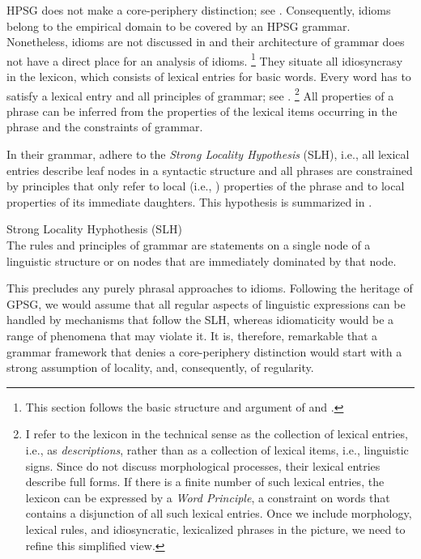 \documentclass[output=paper,biblatex,babelshorthands,newtxmath,draftmode,colorlinks,citecolor=brown]{langscibook}
\begin{document}
\largerpage
HPSG does not make a core-periphery distinction; see \citet{MuellerKernigkeit}. Consequently, idioms belong to the empirical domain to be covered by an HPSG grammar.
Nonetheless, idioms are not discussed in \citet{ps2} and their architecture of grammar does not have a direct place for an analysis of idioms.%
\footnote{This section follows the basic structure and argument of \citet{Sailer:12} and \citet{Richter:Sailer:14}.} 
They situate all idiosyncrasy in the lexicon, which consists of lexical entries for basic words. 
Every word has to satisfy a lexical entry and all principles of grammar; see .%
\footnote{I refer to the lexicon in the technical sense as the collection of lexical entries, i.e., as \emph{descriptions}, rather than as a collection of lexical items, i.e., linguistic signs. 
Since \citet{ps2} do not discuss morphological processes, their lexical entries describe full forms. 
If there is a finite number of such lexical entries, the
lexicon can be expressed by a \emph{Word Principle}, a constraint on words that contains a disjunction of all such lexical entries. 
Once we include morphology, lexical rules, and 
idiosyncratic, lexicalized phrases
in the picture, we need to refine this simplified view.
%
}
%
All properties of a phrase can be inferred from the properties of the lexical items occurring in the phrase and the constraints of grammar. 

In their grammar, \citet{ps2} adhere to the \emph{Strong Locality Hypothesis}
(SLH), i.e., all lexical entries describe
leaf nodes in a syntactic structure and all phrases are constrained by principles that only refer to
local (i.e., ) properties of the phrase and to local properties of its immediate
daughters. This hypothesis is summarized in . 

\eanoraggedright
Strong Locality Hyphothesis\label{slh} (SLH)\\
The rules and principles of grammar are statements on a single node of a linguistic structure or on nodes that are immediately dominated by that node.
\z 

This precludes any purely phrasal approaches to idioms.  Following the heritage of GPSG\indexgpsg,
we would assume that all regular aspects of linguistic expressions can be handled by mechanisms that
follow the SLH, whereas idiomaticity would be a range of phenomena that may violate it.  It is,
therefore, remarkable that a grammar framework that denies a core-periphery distinction would start
with a strong assumption of locality, and, consequently, of regularity.
\end{document}
